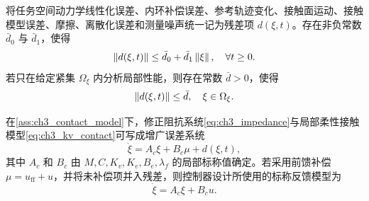 \begin{assumption}[残差项有界性]
\label{ass:ch3_residual}
将任务空间动力学线性化误差、内环补偿误差、参考轨迹变化、接触面运动、接触模型误差、摩擦、离散化误差和测量噪声统一记为残差项 $d(\xi,t)$。存在非负常数 $\bar d_0$ 与 $\bar d_1$，使得
\begin{equation}
  \left\lVert d(\xi,t)\right\rVert\le \bar d_0+\bar d_1\left\lVert \xi\right\rVert,\quad \forall t\ge0 .
  \label{eq:ch3_residual_bound_affine}
\end{equation}
若只在给定紧集 $\Omega_\xi$ 内分析局部性能，则存在常数 $\bar d>0$，使得
\begin{equation}
  \left\lVert d(\xi,t)\right\rVert\le \bar d,
  \quad \xi\in\Omega_\xi .
  \label{eq:ch3_residual_bound_const}
\end{equation}
\end{assumption}

\begin{lemma}[含残差项的增广力位误差系统]
\label{lem:ch3_augmented_system}
在\cref{ass:ch3_contact_model}下，修正阻抗系统\eqref{eq:ch3_impedance}与局部柔性接触模型\eqref{eq:ch3_kv_contact}可写成增广误差系统
\begin{equation}
  \dot\xi=A_c\xi+B_c\mu+d(\xi,t),
  \label{eq:ch3_aug_system_mu}
\end{equation}
其中 $A_c$ 和 $B_c$ 由 $M,C,K_v,K_e,B_e,\lambda_f$ 的局部标称值确定。若采用前馈补偿 $\mu=u_{\mathrm{ff}}+u$，并将未补偿项并入残差，则控制器设计所使用的标称反馈模型为
\begin{equation}
  \dot\xi=A_c\xi+B_cu .
  \label{eq:ch3_nominal_model}
\end{equation}
\end{lemma}


